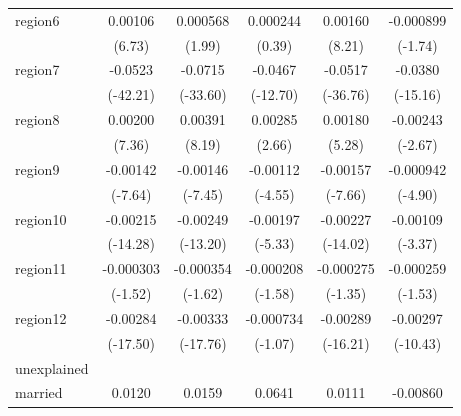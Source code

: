 \begin{table}[htbp]
\begin{tabular}{l*{5}{c}}
region6     &     0.00106\sym{***}&    0.000568\sym{*}  &    0.000244         &     0.00160\sym{***}&   -0.000899         \\
            &      (6.73)         &      (1.99)         &      (0.39)         &      (8.21)         &     (-1.74)         \\
region7     &     -0.0523\sym{***}&     -0.0715\sym{***}&     -0.0467\sym{***}&     -0.0517\sym{***}&     -0.0380\sym{***}\\
            &    (-42.21)         &    (-33.60)         &    (-12.70)         &    (-36.76)         &    (-15.16)         \\
region8     &     0.00200\sym{***}&     0.00391\sym{***}&     0.00285\sym{**} &     0.00180\sym{***}&    -0.00243\sym{**} \\
            &      (7.36)         &      (8.19)         &      (2.66)         &      (5.28)         &     (-2.67)         \\
region9     &    -0.00142\sym{***}&    -0.00146\sym{***}&    -0.00112\sym{***}&    -0.00157\sym{***}&   -0.000942\sym{***}\\
            &     (-7.64)         &     (-7.45)         &     (-4.55)         &     (-7.66)         &     (-4.90)         \\
region10    &    -0.00215\sym{***}&    -0.00249\sym{***}&    -0.00197\sym{***}&    -0.00227\sym{***}&    -0.00109\sym{***}\\
            &    (-14.28)         &    (-13.20)         &     (-5.33)         &    (-14.02)         &     (-3.37)         \\
region11    &   -0.000303         &   -0.000354         &   -0.000208         &   -0.000275         &   -0.000259         \\
            &     (-1.52)         &     (-1.62)         &     (-1.58)         &     (-1.35)         &     (-1.53)         \\
region12    &    -0.00284\sym{***}&    -0.00333\sym{***}&   -0.000734         &    -0.00289\sym{***}&    -0.00297\sym{***}\\
            &    (-17.50)         &    (-17.76)         &     (-1.07)         &    (-16.21)         &    (-10.43)         \\
\hline
unexplained &                     &                     &                     &                     &                     \\
married     &      0.0120         &      0.0159         &      0.0641\sym{*}  &      0.0111         &    -0.00860         \\

\end{tabular}
\end{table}
